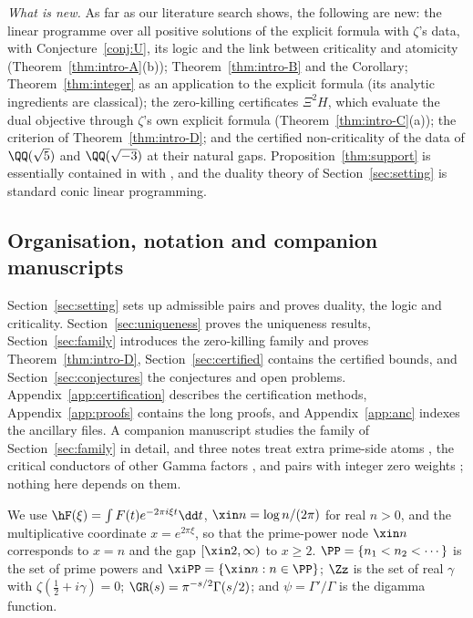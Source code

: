 \emph{What is new.} As far as our literature search shows, the following are new: the linear programme over all positive solutions of
the explicit formula with $\zeta$'s data, with Conjecture~\ref{conj:U}, its logic and the link between criticality and atomicity
(Theorem~\ref{thm:intro-A}(b)); Theorem~\ref{thm:intro-B} and the Corollary; Theorem~\ref{thm:integer} as an application to the explicit formula (its
analytic ingredients are classical); the zero-killing certificates $\Xi^2H$, which evaluate the dual
objective through $\zeta$'s own explicit formula (Theorem~\ref{thm:intro-C}(a)); the criterion of Theorem~\ref{thm:intro-D}; and the
certified non-criticality of the data of $\QQ(\sqrt5)$ and $\QQ(\sqrt{-3})$ at their natural gaps. Proposition~\ref{thm:support} is essentially contained in
\cite[\S4.4]{BRS} with \cite[Corollary~1.1]{BRS}, and the duality theory of Section~\ref{sec:setting} is standard conic linear programming.

\subsection{Organisation, notation and companion manuscripts}

Section~\ref{sec:setting} sets up admissible pairs and proves duality, the logic and criticality. Section~\ref{sec:uniqueness} proves the
uniqueness results, Section~\ref{sec:family} introduces the zero-killing family and proves Theorem~\ref{thm:intro-D},
Section~\ref{sec:certified} contains the certified bounds, and Section~\ref{sec:conjectures} the conjectures and open problems.
Appendix~\ref{app:certification} describes the certification methods, Appendix~\ref{app:proofs} contains the long proofs, and
Appendix~\ref{app:anc} indexes the ancillary files. A companion manuscript \cite{N1} studies the family of Section~\ref{sec:family} in
detail, and three notes treat extra prime-side atoms \cite{N2}, the critical conductors of other Gamma factors \cite{N3}, and pairs with
integer zero weights \cite{N4}; nothing here depends on them.

We use $\hF(\xi)=\int F(t)e^{-2\pi i\xi t}\dd t$, $\xin n=\log n/(2\pi)$ for real $n>0$, and the multiplicative coordinate $x=e^{2\pi\xi}$, so
that the prime-power node $\xin n$ corresponds to $x=n$ and the gap $[\xin2,\infty)$ to $x\ge2$. $\PP=\{n_1<n_2<\cdots\}$ is the set of prime
powers and $\xiPP=\{\xin n:n\in\PP\}$; $\Zz$ is the set of real $\gamma$ with $\zeta(\frac12+i\gamma)=0$; $\GR(s)=\pi^{-s/2}\Gamma(s/2)$; and
$\psi=\Gamma'/\Gamma$ is the digamma function.
